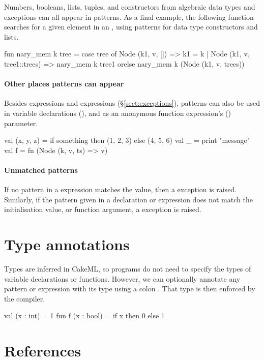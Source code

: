 \documentclass[12pt,a4paper]{book}
\begin{document}
Numbers, booleans, lists, tuples, and constructors from algebraic data types and exceptions can all appear in
patterns. As a final example, the following function searches for a given
element in an , using patterns for data type constructors and lists.
\begin{smlcode}
fun nary_mem k tree =
  case tree of
    Node (k1, v, []) => k1 = k
  | Node (k1, v, tree1::trees) =>
    nary_mem k tree1 orelse nary_mem k (Node (k1, v, trees))
\end{smlcode}

\paragraph{Other places patterns can appear} Besides 
expressions and  expressions (\S\ref{sect:exceptions}),
patterns can also be used in variable declarations (), and as
an anonymous function expression's () parameter.
\begin{smlcode}
val (x, y, z) = if something then (1, 2, 3) else (4, 5, 6)
val _ = print "message"
val f = fn (Node (k, v, ts) => v)
\end{smlcode}

\paragraph{Unmatched patterns}
If no pattern in a  expression matches the value, then a  exception is raised. Similarly, if the pattern given in a  declaration or  expression does not match the initialisation value, or function argument, a  exception is raised.

\section{Type annotations}

Types are inferred in CakeML, so programs do not need to specify the types of
variable declarations or functions. However, we can optionally annotate any
pattern or expression with its type using a colon \smlinline{:}. That type is then enforced by the compiler.
\begin{smlcode}
val (x : int) = 1
fun f (x : bool) = if x then 0 else 1
\end{smlcode}

\section{References}
\label{sect:ref}
\end{document}
